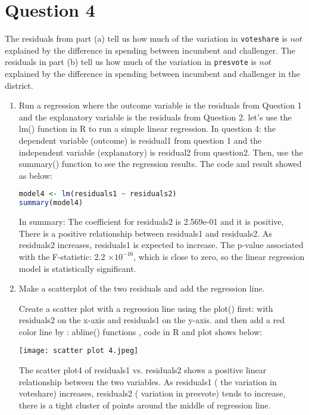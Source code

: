 \documentclass[12pt,letterpaper]{article}
\begin{document}
\section*{Question 4}
\noindent The residuals from part (a) tell us how much of the variation in \texttt{voteshare} is $not$ explained by the difference in spending between incumbent and challenger. The residuals in part (b) tell us how much of the variation in \texttt{presvote} is $not$ explained by the difference in spending between incumbent and challenger in the district.
	\begin{enumerate}
		\item Run a regression where the outcome variable is the residuals from Question 1 and the explanatory variable is the residuals from Question 2.	\vspace{1cm}
\noindent let's use the lm() function in R  to run a simple linear 
           regression. In question 4: the dependent variable (outcome) is residual1 from question 1 and the independent variable (explanatory) is residual2 from question2. Then, use the summary() function to see the regression results. The code and result showed as below:  

  \begin{lstlisting}[language=R] 
model4 <- lm(residuals1 ~ residuals2)
summary(model4)
 \end{lstlisting} 

\noindent In summary: The coefficient for residuals2 is 2.569e-01 and it is positive, There is a positive relationship between residuals1  and residuals2. As residuals2 increases, residuals1 is expected to increase. The p-value associated with the F-statistic: 2.2 $\times 10^{-16}$,  
which is close to zero, so the linear regression model is statistically significant. 
  
		\item Make a scatterplot of the two residuals and add the regression line. 	

  \vspace{2cm}

  Create a scatter plot with a regression line using the plot() first:  with residuals2  on the x-axis and residuals1 on the y-axis.  and  then add a red color line by : abline() functions , code in R and plot shows below:

 \texttt{[image: scatter plot 4.jpeg]} 
 
The scatter plot4  of residuals1 vs. residuals2 shows a positive linear relationship between the two variables. As residuals1 ( the variation in voteshare)  increases, residuals2 ( variation in presvote) tends to increase, there is a tight cluster of points around the middle of regression line.


\end{enumerate}
\end{document}

